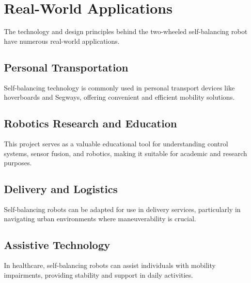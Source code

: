 \section{Real-World Applications}

The technology and design principles behind the two-wheeled self-balancing robot have numerous real-world applications.

\subsection{Personal Transportation}
Self-balancing technology is commonly used in personal transport devices like hoverboards and Segways, offering convenient and efficient mobility solutions.

\subsection{Robotics Research and Education}
This project serves as a valuable educational tool for understanding control systems, sensor fusion, and robotics, making it suitable for academic and research purposes.

\subsection{Delivery and Logistics}
Self-balancing robots can be adapted for use in delivery services, particularly in navigating urban environments where maneuverability is crucial.

\subsection{Assistive Technology}
In healthcare, self-balancing robots can assist individuals with mobility impairments, providing stability and support in daily activities.